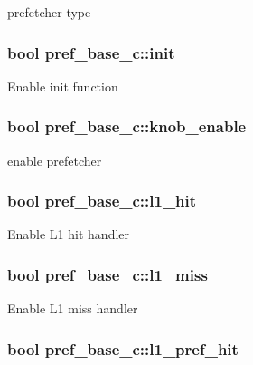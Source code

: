 \label{classpref__base__c_a6fb57b9239bf6a8241c0e3e8d67ba95b}
prefetcher type \hypertarget{classpref__base__c_aae842be24193c5866e6a92b9706da71a}{
\subsubsection[{init}]{\setlength{\rightskip}{0pt plus 5cm}bool {\bf pref\_\-base\_\-c::init}}}
\label{classpref__base__c_aae842be24193c5866e6a92b9706da71a}
Enable init function \hypertarget{classpref__base__c_ad2b3adaf6b7ae24a519451a67cc4f57f}{
\subsubsection[{knob\_\-enable}]{\setlength{\rightskip}{0pt plus 5cm}bool {\bf pref\_\-base\_\-c::knob\_\-enable}}}
\label{classpref__base__c_ad2b3adaf6b7ae24a519451a67cc4f57f}
enable prefetcher \hypertarget{classpref__base__c_a74726ac22c802880c289bf77dd7b6cca}{
\subsubsection[{l1\_\-hit}]{\setlength{\rightskip}{0pt plus 5cm}bool {\bf pref\_\-base\_\-c::l1\_\-hit}}}
\label{classpref__base__c_a74726ac22c802880c289bf77dd7b6cca}
Enable L1 hit handler \hypertarget{classpref__base__c_af3792920c5d8a07bb4b28d4a30d00450}{
\subsubsection[{l1\_\-miss}]{\setlength{\rightskip}{0pt plus 5cm}bool {\bf pref\_\-base\_\-c::l1\_\-miss}}}
\label{classpref__base__c_af3792920c5d8a07bb4b28d4a30d00450}
Enable L1 miss handler \hypertarget{classpref__base__c_ad687a452e183c6fa0d6dce6371a5dfae}{
\subsubsection[{l1\_\-pref\_\-hit}]{\setlength{\rightskip}{0pt plus 5cm}bool {\bf pref\_\-base\_\-c::l1\_\-pref\_\-hit}}}
